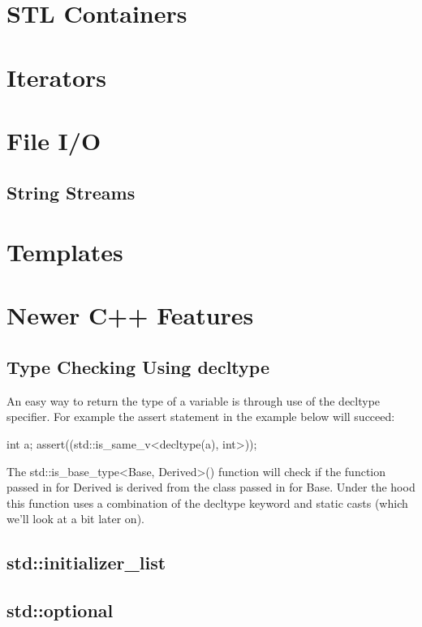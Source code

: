 \documentclass{article}
\begin{document}
\section{STL Containers}

\section{Iterators}

\section{File I/O}

\subsection{String Streams}

\section{Templates}

\section{Newer C++ Features}

\subsection{Type Checking Using decltype}

An easy way to return the type of a variable is through use of the decltype specifier. For example the assert
statement in the example below will succeed:

\begin{cpplst}
int a;
assert((std::is_same_v<decltype(a), int>));
\end{cpplst}

The std::is\_base\_type<Base, Derived>() function will check if the function passed in for Derived is derived
from the class passed in for Base. Under the hood this function uses a combination of the decltype keyword
and static casts (which we'll look at a bit later on).

\subsection{std::initializer\_list}

\subsection{std::optional}
\end{document}
